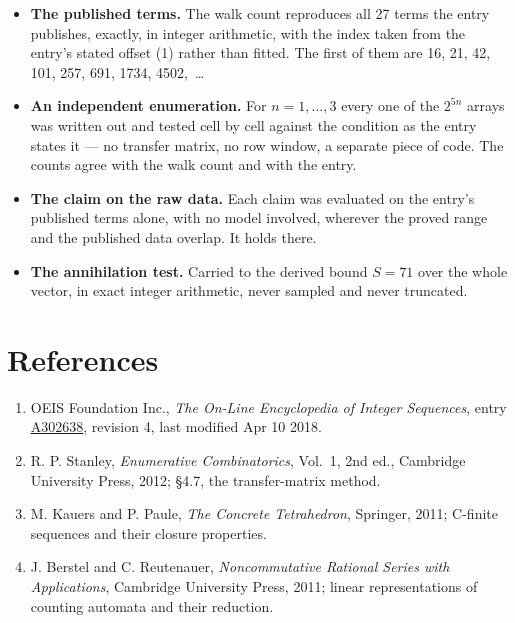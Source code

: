 \documentclass[11pt]{article}
\theoremstyle{definition}
\begin{document}
\begin{itemize}

\item {\bfseries The published terms.} The walk count reproduces all 27 terms the entry publishes, exactly, in integer arithmetic, with the index taken from the entry's stated offset (1) rather than fitted. The first of them are 16, 21, 42, 101, 257, 691, 1734, 4502,~\dots

\item {\bfseries An independent enumeration.} For $n = 1,\dots,3$ every one of the $2^{5n}$ arrays was written out and tested cell by cell against the condition as the entry states it --- no transfer matrix, no row window, a separate piece of code. The counts agree with the walk count and with the entry.

\item {\bfseries The claim on the raw data.} Each claim was evaluated on the entry's published terms alone, with no model involved, wherever the proved range and the published data overlap. It holds there.

\item {\bfseries The annihilation test.} Carried to the derived bound $S = 71$ over the whole vector, in exact integer arithmetic, never sampled and never truncated.

\end{itemize}

\section{References}

\begin{enumerate}

\item OEIS Foundation Inc., \emph{The On-Line Encyclopedia of Integer Sequences}, entry \href{https://oeis.org/A302638}{A302638}, revision 4, last modified Apr 10 2018.

\item R. P. Stanley, \emph{Enumerative Combinatorics}, Vol.~1, 2nd ed., Cambridge University Press, 2012; \S4.7, the transfer-matrix method.

\item M. Kauers and P. Paule, \emph{The Concrete Tetrahedron}, Springer, 2011; C-finite sequences and their closure properties.

\item J. Berstel and C. Reutenauer, \emph{Noncommutative Rational Series with Applications}, Cambridge University Press, 2011; linear representations of counting automata and their reduction.

\end{enumerate}
\end{document}

